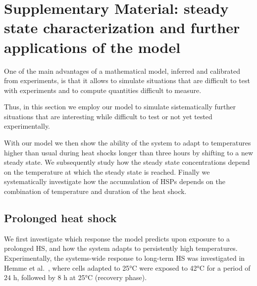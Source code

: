 \documentclass[oneside, 10pt, a4paper, twocolumn]{article}
\begin{document}
\clearpage





\section{Supplementary Material: steady state characterization and further applications of the model}

One of the main advantages of a mathematical model, inferred and calibrated from experiments, is that it allows to simulate situations that are difficult to test with experiments and to compute quantities difficult to measure.

Thus, in this section we employ our model to simulate sistematically further situations that are interesting while difficult to test or not yet tested experimentally. 

With our model we then show the ability of the system to adapt to temperatures higher than usual during heat shocks longer than three hours by shifting to a new steady state. 
We subsequently study how the steady state concentrations depend on the temperature at which the steady state is reached. 
Finally we systematically investigate how the accumulation of HSPs depends on the combination of temperature and duration of the heat shock. 





\subsection{Prolonged heat shock}
\label{SecAcclimation}

We first investigate which response the model predicts upon exposure to a prolonged HS, and how
the system adapts to persistently high temperatures.
Experimentally, the systems-wide response to long-term HS was investigated in Hemme et al.~\cite{Hemme2014},
where cells adapted to 25°C were exposed to 42°C for a period of $24$ h, followed by $8$ h at 25°C (recovery phase).

\end{document}
